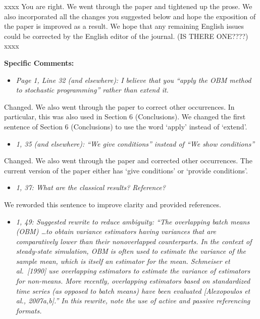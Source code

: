 \documentclass[11pt,notitlepage,onecolumn]{article}
\newcommand{\noi}{\noindent}
\begin{document}
\noindent  
xxxx
You are right. 
We went through the paper and tightened up the prose. 
We also incorporated all the changes you suggested below and hope the exposition of the paper is improved as a result.
We hope that any remaining English issues could be corrected by the English editor of the journal. (IS THERE ONE????) 
xxxx
\medskip 

\bigskip 


\noi  
{\large \bf Specific Comments:}
\medskip 


\begin{itemize}
\item[] \textit{Page 1, Line 32 (and elsewhere): I believe that you ``apply the OBM method to stochastic programming'' rather than extend it.}
\end{itemize}

\noi
Changed.  
We also went through the paper to correct other occurrences. 
In particular, this was also used in Section 6 (Conclusions). 
We changed the first sentence of Section 6 (Conclusions) to use the word `apply' instead of `extend'. 

\medskip 



\begin{itemize}
\item[] \textit{1, 35 (and elsewhere): ``We give conditions'' instead of ``We show conditions''}
\end{itemize}

\noi
Changed. 
We also went through the paper and corrected other occurrences. 
The current version of the paper either has `give conditions' or `provide conditions'. 
\medskip 


\begin{itemize}
\item[] \textit{1, 37: What are the classical results? Reference?}
\end{itemize}

\noi
We reworded this sentence to improve clarity and provided references.   
\medskip 



\begin{itemize}
\item[] \textit{1, 49: Suggested rewrite to reduce ambiguity: ``The overlapping batch means (OBM) \ldots to obtain variance estimators having variances that are comparatively lower than their nonoverlapped counterparts. 
In the context of steady-state simulation, OBM is often used to estimate the variance of the sample mean, which is itself an estimator for the mean. 
Schmeiser et al.\ [1990] use overlapping estimators to estimate the
variance of estimators for non-means. 
More recently, overlapping estimators based on standardized time series (as opposed to batch means) have been evaluated [Alexopoulos et al., 2007a,b].'' 
In this rewrite, note the use of active and passive referencing formats.}
\end{itemize}
\end{document}
